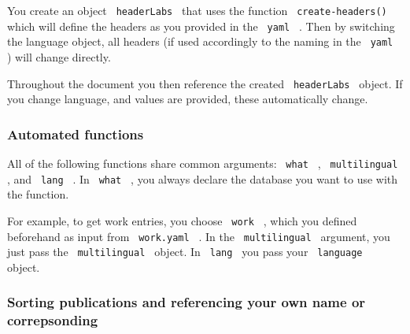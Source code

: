 You create an object \texttt{\ headerLabs\ } that uses the function
\texttt{\ create-headers()\ } which will define the headers as you
provided in the \texttt{\ yaml\ } . Then by switching the language
object, all headers (if used accordingly to the naming in the
\texttt{\ yaml\ } ) will change directly.

Throughout the document you then reference the created
\texttt{\ headerLabs\ } object. If you change language, and values are
provided, these automatically change.

\begin{Shaded}
\begin{Highlighting}[]




\end{Highlighting}
\end{Shaded}

\subsubsection{Automated functions}\label{automated-functions}

All of the following functions share common arguments: \texttt{\ what\ }
, \texttt{\ multilingual\ } , and \texttt{\ lang\ } . In
\texttt{\ what\ } , you always declare the database you want to use with
the function.

For example, to get work entries, you choose \texttt{\ work\ } , which
you defined beforehand as input from \texttt{\ work.yaml\ } . In the
\texttt{\ multilingual\ } argument, you just pass the
\texttt{\ multilingual\ } object. In \texttt{\ lang\ } you pass your
\texttt{\ language\ } object.

\begin{Shaded}
\begin{Highlighting}[]

\end{Highlighting}
\end{Shaded}

\subsubsection{Sorting publications and referencing your own name or
correpsonding}\label{sorting-publications-and-referencing-your-own-name-or-correpsonding}

